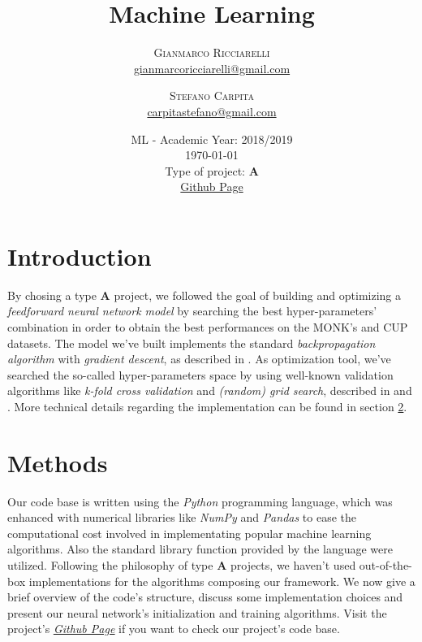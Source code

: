\documentclass[11pt,twoside]{article}
\title{Machine Learning} %
\author{%
\textsc{Gianmarco Ricciarelli} \\[1ex] %
\normalsize \href{mailto:john@smith.com}{gianmarcoricciarelli@gmail.com} %
\and %
\textsc{Stefano Carpita} \\[1ex] %
\normalsize \href{mailto:jane@smith.com}{carpitastefano@gmail.com} %
}
\date{
    ML - Academic Year: 2018/2019 \\
    {\vspace{0.25cm}}
    \today \\
    {\vspace{0.25cm}}
    Type of project: \textbf{A} \\
    {\vspace{0.25cm}}
    \href{https://github.com/germz01/machinel-learning}{Github Page}
}
\begin{document}
\maketitle


\section{Introduction} %
\label{sec:introduction}
    By chosing a type \textbf{A} project, we followed the goal of building and optimizing a
    \textit{feedforward neural network model} by searching the best hyper-parameters' combination in order to
    obtain the best performances on the MONK's and CUP datasets. The model we've built implements the
    standard \textit{backpropagation algorithm} with \textit{gradient descent}, as described in
    \cite{deep_learning}. As optimization tool, we've searched the so-called hyper-parameters space by using
    well-known validation algorithms like \textit{k-fold cross validation} and \textit{(random) grid search},
    described in \cite{deep_learning} and \cite{random_search}. More technical details regarding the
    implementation can be found in section \ref{sec:methods}.


\section{Methods} %
\label{sec:methods}
    Our code base is written using the \textit{Python} programming language, which was enhanced with
    numerical libraries like \textit{NumPy} and \textit{Pandas} to ease the computational cost involved in
    implementating popular machine learning algorithms. Also the standard library function provided by the
    language were utilized. Following the philosophy of type \textbf{A} projects, we haven't used
    out-of-the-box implementations for the algorithms composing our framework. We now give a brief overview of
    the code's structure, discuss some implementation choices and present our neural network's initialization
    and training algorithms. Visit the project's
    \href{https://github.com/germz01/machinel-learning}{\underline{\textit{Github Page}}} if you want to check
    our project's code base.
\end{document}
